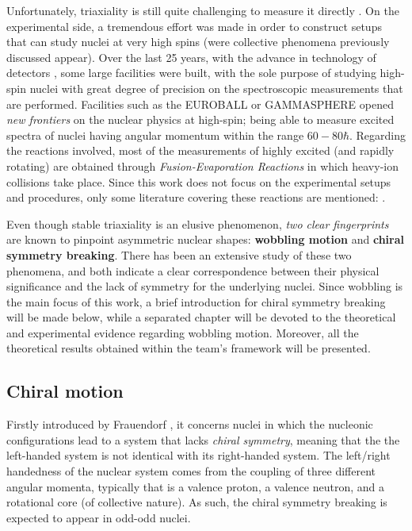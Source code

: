 Unfortunately, triaxiality is still quite challenging to measure it directly \cite{hamamoto2016interplay,budaca2018tilted}. On the experimental side, a tremendous effort was made in order to construct setups that can study nuclei at very high spins (were collective phenomena previously discussed appear). Over the last 25 years, with the advance in technology of detectors \cite{henning2012stability}, some large facilities were built, with the sole purpose of studying high-spin nuclei with great degree of precision on the spectroscopic measurements that are performed. Facilities such as the EUROBALL \cite{simpson1997euroball} or GAMMASPHERE \cite{lee1990gammasphere} opened \emph{new frontiers} on the nuclear physics at high-spin; being able to measure excited spectra of nuclei having angular momentum within the range $60-80\hbar$. Regarding the reactions involved, most of the measurements of highly excited (and rapidly rotating) are obtained through \emph{Fusion-Evaporation Reactions} in which heavy-ion collisions take place. Since this work does not focus on the experimental setups and procedures, only some literature covering these reactions are mentioned: \cite{gu2007theoretical,henning2012stability,ayangeakaa2013exotic,matta2017exotic,das2018nuclear,lewis2019lifetime,sensharma2021wobbling}.

Even though stable triaxiality is an elusive phenomenon, \emph{two clear fingerprints} are known to pinpoint asymmetric nuclear shapes: \textbf{wobbling motion} and \textbf{chiral symmetry breaking}. There has been an extensive study of these two phenomena, and both indicate a clear correspondence between their physical significance and the lack of symmetry for the underlying nuclei. Since wobbling is the main focus of this work, a brief introduction for chiral symmetry breaking will be made below, while a separated chapter will be devoted to the theoretical and experimental evidence regarding wobbling motion. Moreover, all the theoretical results obtained within the team's framework will be presented.

\subsection{Chiral motion}

Firstly introduced by Frauendorf \cite{frauendorf1997tilted}, it concerns nuclei in which the nucleonic configurations lead to a system that lacks \emph{chiral symmetry}, meaning that the the left-handed system is not identical with its right-handed system. The left/right handedness of the nuclear system comes from the coupling of three different angular momenta, typically that is a valence proton, a valence neutron, and a rotational core (of collective nature). As such, the chiral symmetry breaking is expected to appear in odd-odd nuclei.

